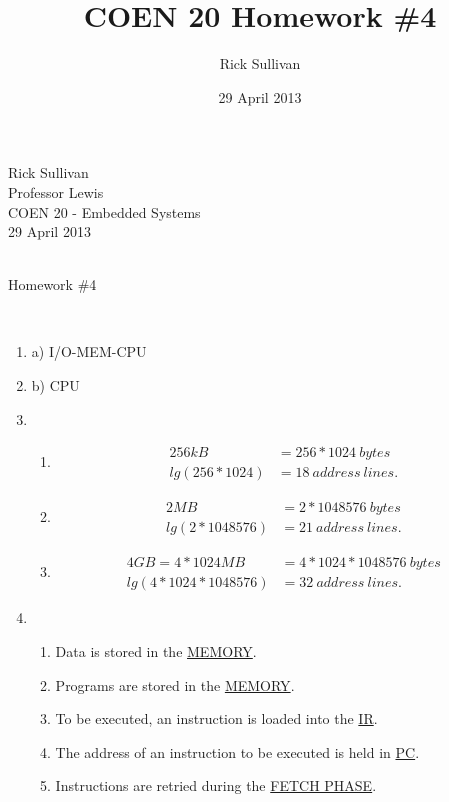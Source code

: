 \documentclass{article}
\title{COEN 20 Homework \#4}
\date{29 April 2013}
\author{Rick Sullivan}
\begin{document}
\noindent Rick Sullivan     \\
          Professor Lewis   \\
          COEN 20 - Embedded Systems    \\
          29 April 2013     \\
                            \\
\centerline{Homework \#4}   \\
                            
\begin{enumerate}
	\item   a) I/O-MEM-CPU
	\item   b) CPU
	\item   \begin{enumerate}
                \item   \begin{align*}
                        256 kB &= 256 * 1024\ bytes          \\
                        lg(256*1024) &= 18\ address\ lines.    
                        \end{align*}
                \item   \begin{align*} 
                        2 MB &= 2 * 1048576\ bytes             \\
                        lg(2 * 1048576) &= 21\ address\ lines.
                        \end{align*}
                \item   \begin{align*}
                        4 GB = 4 * 1024 MB &= 4 * 1024 * 1048576\ bytes  \\
                        lg(4 * 1024 * 1048576) &= 32\ address\ lines.
                        \end{align*}
            \end{enumerate}
	\item   \begin{enumerate}
                \item   Data is stored in the \underline{MEMORY}.
                \item   Programs are stored in the \underline{MEMORY}.
                \item   To be executed, an instruction is loaded into the \underline{IR}.
                \item   The address of an instruction to be executed is held in \underline{PC}.
                \item   Instructions are retried during the \underline{FETCH PHASE}.

\end{enumerate}
\end{enumerate}
\end{document}
